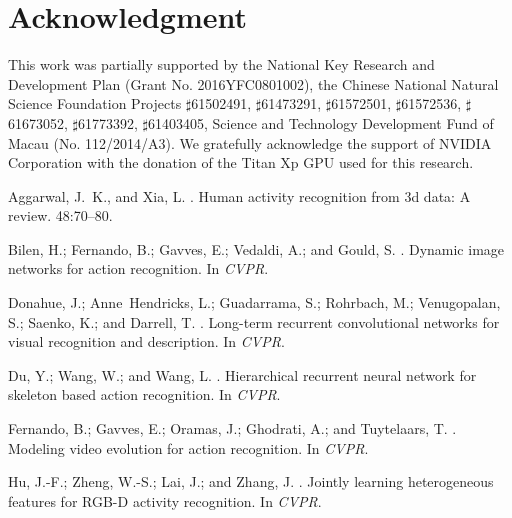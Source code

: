 \documentclass[letterpaper]{article} %
\begin{document}
\section*{Acknowledgment}
This work was partially supported by the National Key Research and Development Plan (Grant No. 2016YFC0801002), the Chinese National Natural Science Foundation Projects $\sharp$61502491, $\sharp$61473291, $\sharp$61572501, $\sharp$61572536, $\sharp$61673052, $\sharp$61773392, $\sharp$61403405, Science and Technology Development Fund of Macau (No. 112/2014/A3). We gratefully acknowledge the support of NVIDIA Corporation with the donation of the Titan Xp GPU used for this research.
\small



\begin{thebibliography}{}

Aggarwal, J.~K., and Xia, L.
.
\newblock Human activity recognition from 3d data: A review.
 48:70--80.

Bilen, H.; Fernando, B.; Gavves, E.; Vedaldi, A.; and Gould, S.
.
\newblock Dynamic image networks for action recognition.
\newblock In {\em CVPR}.

Donahue, J.; Anne~Hendricks, L.; Guadarrama, S.; Rohrbach, M.; Venugopalan, S.;
  Saenko, K.; and Darrell, T.
.
\newblock Long-term recurrent convolutional networks for visual recognition and
  description.
\newblock In {\em CVPR}.

Du, Y.; Wang, W.; and Wang, L.
.
\newblock Hierarchical recurrent neural network for skeleton based action
  recognition.
\newblock In {\em CVPR}.

Fernando, B.; Gavves, E.; Oramas, J.; Ghodrati, A.; and Tuytelaars, T.
.
\newblock Modeling video evolution for action recognition.
\newblock In {\em CVPR}.

Hu, J.-F.; Zheng, W.-S.; Lai, J.; and Zhang, J.
.
\newblock Jointly learning heterogeneous features for {RGB-D} activity
  recognition.
\newblock In {\em CVPR}.


\end{thebibliography}
\end{document}

